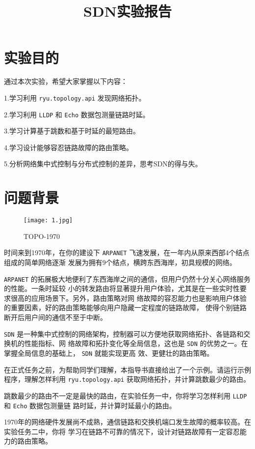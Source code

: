 \documentclass{xjtureport}
\title{SDN实验报告}
\date{\zhtoday}
\begin{document}
\makecover
\makeheader
\tableofcontents
\newpage

\section{实验目的}
通过本次实验，希望大家掌握以下内容：\par
1.学习利用 \texttt{ryu.topology.api} 发现网络拓扑。\par
2.学习利用 \texttt{LLDP} 和 \texttt{Echo} 数据包测量链路时延。\par
3.学习计算基于跳数和基于时延的最短路由。\par
4.学习设计能够容忍链路故障的路由策略。\par
5.分析网络集中式控制与分布式控制的差异，思考SDN的得与失。
\section{问题背景}
\begin{figure}[H]
	\centering
	\texttt{[image: 1.jpg]}
	\caption{TOPO-1970}
\end{figure}
时间来到1970年，在你的建设下 \texttt{ARPANET} 飞速发展，在一年内从原来西部4个结点组成的简单网络逐渐
发展为拥有9个结点，横跨东西海岸，初具规模的网络。\par
\texttt{ARPANET} 的拓展极大地便利了东西海岸之间的通信，但用户仍然十分关心网络服务的性能。一条时延较
小的转发路由将显著提升用户体验，尤其是在一些实时性要求很高的应用场景下。另外，路由策略对网
络故障的容忍能力也是影响用户体验的重要因素，好的路由策略能够向用户隐藏一定程度的链路故障，
使得个别链路断开后用户间的通信不至于中断。\par
\texttt{SDN} 是一种集中式控制的网络架构，控制器可以方便地获取网络拓扑、各链路和交换机的性能指标、网
络故障和拓扑变化等全局信息，这也是 \texttt{SDN} 的优势之一。在掌握全局信息的基础上， \texttt{SDN} 就能实现更高
效、更健壮的路由策略。\par
在正式任务之前，为帮助同学们理解，本指导书直接给出了一个示例。请运行示例程序，理解怎样利用
\texttt{ryu.topology.api} 获取网络拓扑，并计算跳数最少的路由。\par
跳数最少的路由不一定是最快的路由，在实验任务一中，你将学习怎样利用 \texttt{LLDP} 和 \texttt{Echo} 数据包测量链
路时延，并计算时延最小的路由。\par
1970年的网络硬件发展尚不成熟，通信链路和交换机端口发生故障的概率较高。在实验任务二中，你将
学习在链路不可靠的情况下，设计对链路故障有一定容忍能力的路由策略。
\end{document}
